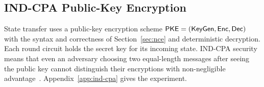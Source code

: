 \subsection{IND-CPA Public-Key Encryption}
\label{sec:ind-cpa}

State transfer uses a public-key encryption scheme
$\mathsf{PKE}=(\mathsf{KeyGen},\mathsf{Enc},\mathsf{Dec})$ with the syntax and correctness of
Section~\ref{sec:nce} and deterministic decryption. Each round circuit
holds the secret key for its incoming state. IND-CPA security means that
even an adversary choosing two equal-length messages after seeing the
public key cannot distinguish their encryptions with non-negligible
advantage~\cite{GoldwasserMicali1982Encryption,GoldwasserMicali1984Encryption,BellareEtAl1998EncryptionNotions}.
Appendix~\ref{app:ind-cpa} gives the experiment.
